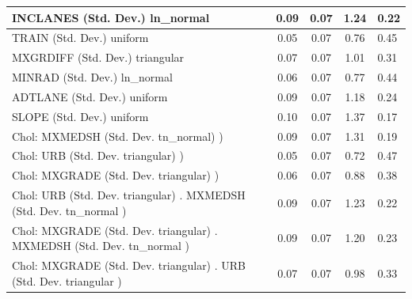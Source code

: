 \begin{table}
\begin{center}
\begin{tabular}{|l|l|c|c|c|l|}
			\hline
			INCLANES (Std. Dev.) ln_normal &  & 0.09 & 0.07 & 1.24 & 0.22 \\
			\hline
			TRAIN (Std. Dev.) uniform &  & 0.05 & 0.07 & 0.76 & 0.45 \\
			\hline
			MXGRDIFF (Std. Dev.) triangular &  & 0.07 & 0.07 & 1.01 & 0.31 \\
			\hline
			MINRAD (Std. Dev.) ln_normal &  & 0.06 & 0.07 & 0.77 & 0.44 \\
			\hline
			ADTLANE (Std. Dev.) uniform &  & 0.09 & 0.07 & 1.18 & 0.24 \\
			\hline
			SLOPE (Std. Dev.) uniform &  & 0.10 & 0.07 & 1.37 & 0.17 \\
			\hline
			 Chol: MXMEDSH (Std. Dev. tn_normal) ) &  & 0.09 & 0.07 & 1.31 & 0.19 \\
			\hline
			 Chol: URB (Std. Dev. triangular) ) &  & 0.05 & 0.07 & 0.72 & 0.47 \\
			\hline
			 Chol: MXGRADE (Std. Dev. triangular) ) &  & 0.06 & 0.07 & 0.88 & 0.38 \\
			\hline
			 Chol: URB (Std. Dev. triangular) . MXMEDSH (Std. Dev.   tn_normal ) &  & 0.09 & 0.07 & 1.23 & 0.22 \\
			\hline
			 Chol: MXGRADE (Std. Dev. triangular) . MXMEDSH (Std. Dev.   tn_normal ) &  & 0.09 & 0.07 & 1.20 & 0.23 \\
			\hline
			 Chol: MXGRADE (Std. Dev. triangular) . URB (Std. Dev.   triangular ) &  & 0.07 & 0.07 & 0.98 & 0.33 \\
			\hline
		\end{tabular}
	\end{center}
\end{table}